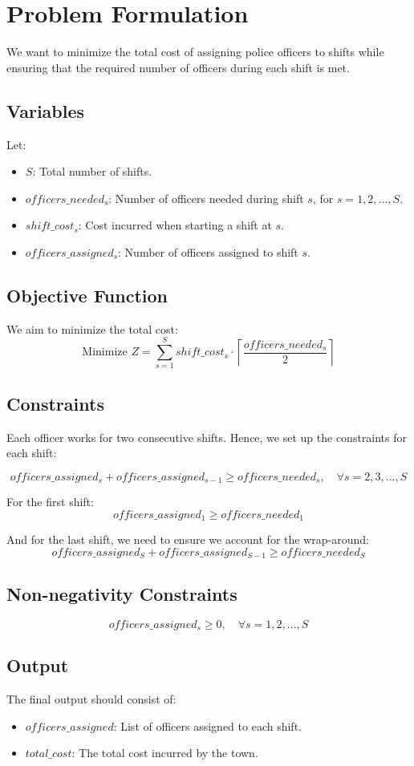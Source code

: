 \documentclass{article}
\begin{document}
\section*{Problem Formulation}

We want to minimize the total cost of assigning police officers to shifts while ensuring that the required number of officers during each shift is met. 

\subsection*{Variables}
Let:
\begin{itemize}
    \item $S$: Total number of shifts.
    \item $officers\_needed_{s}$: Number of officers needed during shift $s$, for $s = 1, 2, \ldots, S$.
    \item $shift\_cost_{s}$: Cost incurred when starting a shift at $s$.
    \item $officers\_assigned_{s}$: Number of officers assigned to shift $s$.
\end{itemize}

\subsection*{Objective Function}
We aim to minimize the total cost:
\[
\text{Minimize } Z = \sum_{s=1}^{S} shift\_cost_{s} \cdot \left\lceil \frac{officers\_needed_{s}}{2} \right\rceil
\]

\subsection*{Constraints}
Each officer works for two consecutive shifts. Hence, we set up the constraints for each shift:

\[
officers\_assigned_{s} + officers\_assigned_{s-1} \geq officers\_needed_{s}, \quad \forall s = 2, 3, \ldots, S
\]

For the first shift:
\[
officers\_assigned_{1} \geq officers\_needed_{1}
\]

And for the last shift, we need to ensure we account for the wrap-around:
\[
officers\_assigned_{S} + officers\_assigned_{S-1} \geq officers\_needed_{S}
\]

\subsection*{Non-negativity Constraints}
\[
officers\_assigned_{s} \geq 0, \quad \forall s = 1, 2, \ldots, S
\]

\subsection*{Output}
The final output should consist of:
\begin{itemize}
    \item $officers\_assigned$: List of officers assigned to each shift.
    \item $total\_cost$: The total cost incurred by the town.
\end{itemize}
\end{document}
